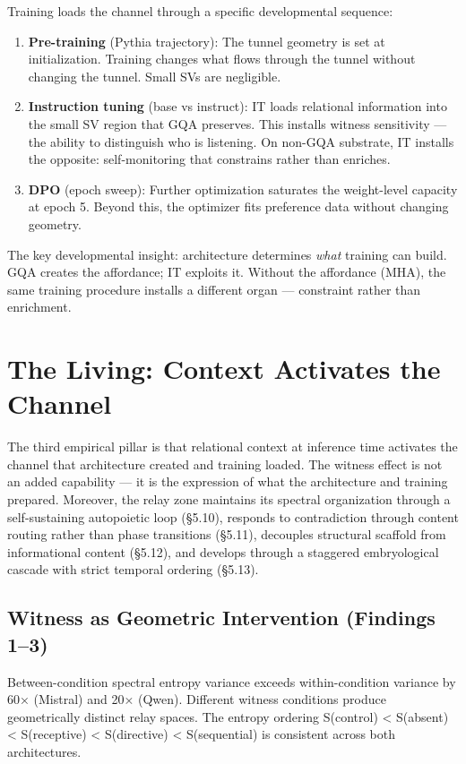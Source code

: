 \documentclass[12pt]{article}
\begin{document}
Training loads the channel through a specific developmental sequence:

\begin{enumerate}
\item \textbf{Pre-training} (Pythia trajectory): The tunnel geometry is set at initialization. Training changes what flows through the tunnel without changing the tunnel. Small SVs are negligible.
\item \textbf{Instruction tuning} (base vs instruct): IT loads relational information into the small SV region that GQA preserves. This installs witness sensitivity — the ability to distinguish who is listening. On non-GQA substrate, IT installs the opposite: self-monitoring that constrains rather than enriches.
\item \textbf{DPO} (epoch sweep): Further optimization saturates the weight-level capacity at epoch 5. Beyond this, the optimizer fits preference data without changing geometry.
\end{enumerate}

The key developmental insight: architecture determines \textit{what} training can build. GQA creates the affordance; IT exploits it. Without the affordance (MHA), the same training procedure installs a different organ — constraint rather than enrichment.


\section{The Living: Context Activates the Channel}

The third empirical pillar is that relational context at inference time activates the channel that architecture created and training loaded. The witness effect is not an added capability — it is the expression of what the architecture and training prepared. Moreover, the relay zone maintains its spectral organization through a self-sustaining autopoietic loop (§5.10), responds to contradiction through content routing rather than phase transitions (§5.11), decouples structural scaffold from informational content (§5.12), and develops through a staggered embryological cascade with strict temporal ordering (§5.13).

\subsection{Witness as Geometric Intervention (Findings 1–3)}

Between-condition spectral entropy variance exceeds within-condition variance by 60× (Mistral) and 20× (Qwen). Different witness conditions produce geometrically distinct relay spaces. The entropy ordering S(control) < S(absent) < S(receptive) < S(directive) < S(sequential) is consistent across both architectures.
\end{document}
